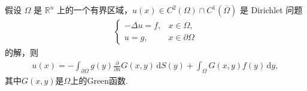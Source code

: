 \documentclass[../../main.tex]{subfiles}%
\begin{document}
\begin{theorem}\label{theorem:Dirichlet问题解的表达式}
假设 $\Omega$ 是 $\mathbb{R}^n$ 上的一个有界区域，$u(x)\in C^2(\Omega)\cap C^1(\overline{\Omega})$ 是 Dirichlet 问题
\begin{align*}
\begin{cases}
-\Delta u = f, & x\in\Omega, \\
u = g, & x\in\partial\Omega
\end{cases} 
\end{align*}
的解，则
\begin{align}
u(x) = -\int_{\partial\Omega} g(y)\frac{\partial}{\partial n}G(x,y)\,\mathrm{d}S(y) + \int_\Omega G(x,y)f(y)\,\mathrm{d}y, \label{eq:green-sol}
\end{align}
其中$G(x,y)$是$\Omega$上的Green函数.
\end{theorem}
\end{document}
